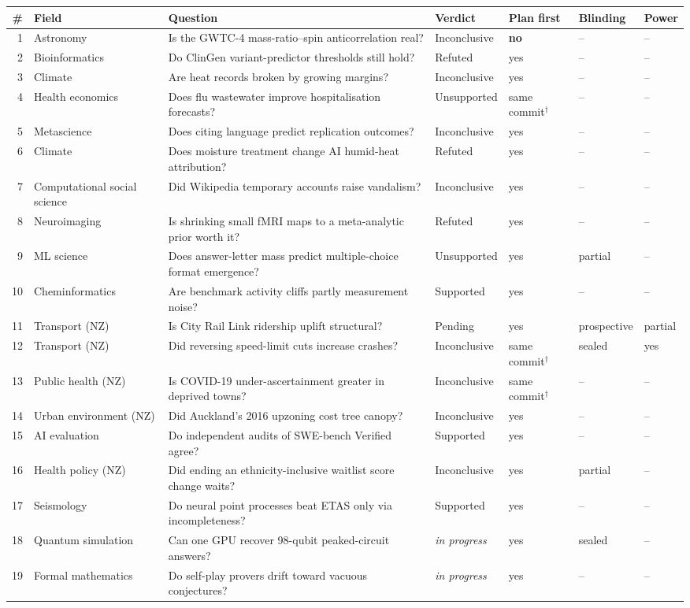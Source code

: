 \begin{tabularx}{\textwidth}{@{}rl X l l l l@{}}
\toprule
\# & Field & Question & Verdict & Plan first & Blinding & Power \\
\midrule
1 & Astronomy & Is the GWTC-4 mass-ratio--spin anticorrelation real? & Inconclusive & \textbf{no} & -- & -- \\
2 & Bioinformatics & Do ClinGen variant-predictor thresholds still hold? & Refuted & yes & -- & -- \\
3 & Climate & Are heat records broken by growing margins? & Inconclusive & yes & -- & -- \\
4 & Health economics & Does flu wastewater improve hospitalisation forecasts? & Unsupported & same commit$^\dagger$ & -- & -- \\
5 & Metascience & Does citing language predict replication outcomes? & Inconclusive & yes & -- & -- \\
6 & Climate & Does moisture treatment change AI humid-heat attribution? & Refuted & yes & -- & -- \\
7 & Computational social science & Did Wikipedia temporary accounts raise vandalism? & Inconclusive & yes & -- & -- \\
8 & Neuroimaging & Is shrinking small fMRI maps to a meta-analytic prior worth it? & Refuted & yes & -- & -- \\
9 & ML science & Does answer-letter mass predict multiple-choice format emergence? & Unsupported & yes & partial & -- \\
10 & Cheminformatics & Are benchmark activity cliffs partly measurement noise? & Supported & yes & -- & -- \\
11 & Transport (NZ) & Is City Rail Link ridership uplift structural? & Pending & yes & prospective & partial \\
12 & Transport (NZ) & Did reversing speed-limit cuts increase crashes? & Inconclusive & same commit$^\dagger$ & sealed & yes \\
13 & Public health (NZ) & Is COVID-19 under-ascertainment greater in deprived towns? & Inconclusive & same commit$^\dagger$ & -- & -- \\
14 & Urban environment (NZ) & Did Auckland's 2016 upzoning cost tree canopy? & Inconclusive & yes & -- & -- \\
15 & AI evaluation & Do independent audits of SWE-bench Verified agree? & Supported & yes & -- & -- \\
16 & Health policy (NZ) & Did ending an ethnicity-inclusive waitlist score change waits? & Inconclusive & yes & partial & -- \\
17 & Seismology & Do neural point processes beat ETAS only via incompleteness? & Supported & yes & -- & -- \\
18 & Quantum simulation & Can one GPU recover 98-qubit peaked-circuit answers? & \emph{in progress} & yes & sealed & -- \\
19 & Formal mathematics & Do self-play provers drift toward vacuous conjectures? & \emph{in progress} & yes & -- & -- \\
\bottomrule
\end{tabularx}
